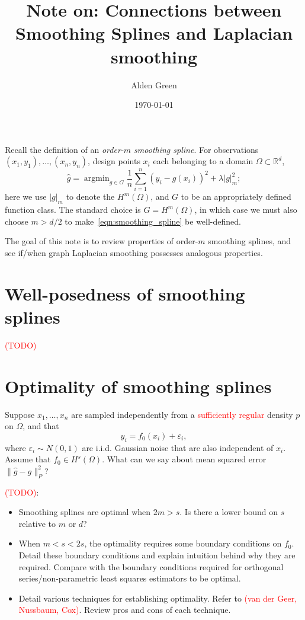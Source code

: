 \documentclass{article}
\newcommand{\Reals}{\mathbb{R}}
\newcommand{\1}{\mathbf{1}}
\DeclareMathOperator*{\argmin}{argmin}
\newcommand{\Rd}{\Reals^d}
\newcommand{\wh}[1]{\widehat{#1}}
\theoremstyle{alden}
\theoremstyle{aldenthm}
\theoremstyle{definition}
\theoremstyle{remark}
\begin{document}
\title{Note on: Connections between Smoothing Splines and Laplacian smoothing}
\author{Alden Green}
\date{\today}
\maketitle

Recall the definition of an \emph{order-$m$ smoothing spline}. For observations $(x_1,y_1),\ldots,(x_n,y_n)$, design points $x_i$ each belonging to a domain $\Omega \subset \Rd$, 
\begin{equation}
\label{eqn:smoothing_spline}
\wh{g} = \argmin_{g \in G} \frac{1}{n} \sum_{i = 1}^{n} (y_i - g(x_i))^2 + \lambda |g|_{m}^2;
\end{equation}
here we use $|g|_{m}$ to denote the $H^m(\Omega)$, and $G$ to be an appropriately defined function class. The standard choice is $G = H^m(\Omega)$, in which case we must also choose $m > d/2$ to make~\eqref{eqn:smoothing_spline} be well-defined. 

The goal of this note is to review properties of order-$m$ smoothing splines, and see if/when graph Laplacian smoothing possesses analogous properties. 

\section{Well-posedness of smoothing splines}
\textcolor{red}{(TODO)}

\section{Optimality of smoothing splines}
Suppose $x_1,\ldots,x_n$ are sampled independently from a \textcolor{red}{sufficiently regular} density $p$ on $\Omega$, and that
\begin{equation}
\label{model:regression}
y_i = f_0(x_i) + \varepsilon_i,
\end{equation}
where $\varepsilon_i \sim N(0,1)$ are i.i.d. Gaussian noise that are also independent of $x_i$. Assume that $f_0 \in H^s(\Omega)$. What can we say about mean squared error $\|\wh{g} - g\|_P^2$?

\textcolor{red}{(TODO)}:
\begin{itemize}
	\item Smoothing splines are optimal when $2m > s$. Is there a lower bound on $s$ relative to $m$ or $d$?
	\item When $m < s < 2s$, the optimality requires some boundary conditions on $f_0$. Detail these boundary conditions and explain intuition behind why they are required. Compare with the boundary conditions required for orthogonal series/non-parametric least squares estimators to be optimal.
 	\item Detail various techniques for establishing optimality. Refer to \textcolor{red}{(van der Geer, Nussbaum, Cox)}. Review pros and cons of each technique.
\end{itemize}
\end{document}
